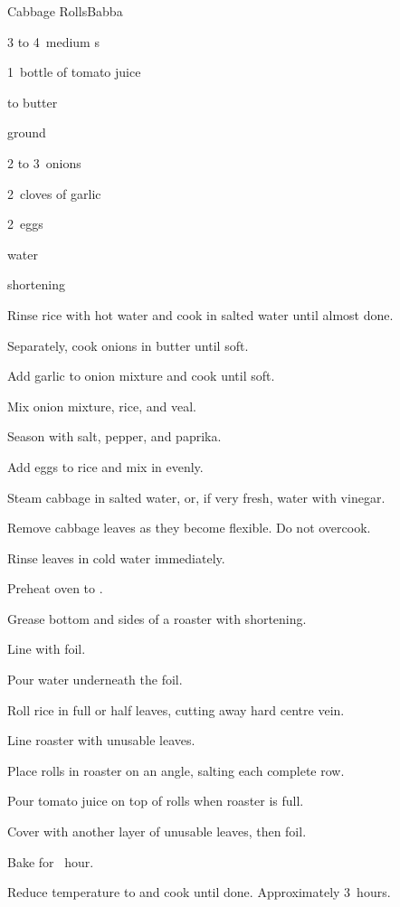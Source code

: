 \begin{recipe}{Cabbage Rolls}{Babba}{}

\begin{ingredients}
\item 3 to 4~medium s
\item 1~bottle of tomato juice
\item {} 
\item \lbs{\quarter} to \lbs{\half} butter
\item {} ground 
\item 2 to 3~onions
\item 2~cloves of garlic
\item 2~eggs
\item {} water
\item shortening
\end{ingredients}

\begin{directions}
\item Rinse rice with hot water and cook in salted water until almost done.
\item Separately, cook onions in butter until soft.
\item Add garlic to onion mixture and cook until soft.
\item Mix onion mixture, rice, and veal.
\item Season with salt, pepper, and paprika.
\item Add eggs to rice and mix in evenly.
\item Steam cabbage in salted water, or, if very fresh, water with vinegar.
\item Remove cabbage leaves as they become flexible. Do not overcook.
\item Rinse leaves in cold water immediately.
\item Preheat oven to .
\item Grease bottom and sides of a roaster with shortening.
\item Line with foil.
\item Pour water underneath the foil.
\item Roll rice in full or half leaves, cutting away hard centre vein.
\item Line roaster with unusable leaves.
\item Place rolls in roaster on an angle, salting each complete row.
\item Pour tomato juice on top of rolls when roaster is full.
\item Cover with another layer of unusable leaves, then foil.
\item Bake for \half~hour.
\item Reduce temperature to  and cook until done. Approximately 3~hours.
\end{directions}

\hint{}
\end{recipe}

